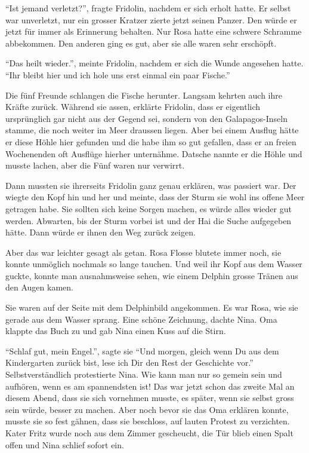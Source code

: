 \enquote{Ist jemand verletzt?}, fragte Fridolin, nachdem er sich erholt hatte. Er selbst war unverletzt, nur ein grosser Kratzer zierte jetzt seinen Panzer. Den würde er jetzt für immer als Erinnerung behalten. Nur Rosa hatte eine schwere Schramme abbekommen. Den anderen ging es gut, aber sie alle waren sehr erschöpft.

\enquote{Das heilt wieder.}, meinte Fridolin, nachdem er sich die Wunde angesehen hatte. \enquote{Ihr bleibt hier und ich hole uns erst einmal ein paar Fische.}

Die fünf Freunde schlangen die Fische herunter. Langsam kehrten auch ihre Kräfte zurück. Während sie assen, erklärte Fridolin, dass er eigentlich ursprünglich gar nicht aus der Gegend sei, sondern von den Galapagos-Inseln stamme, die noch weiter im Meer draussen liegen. Aber bei einem Ausflug hätte er diese Höhle hier gefunden und die habe ihm so gut gefallen, dass er an freien Wochenenden oft Ausflüge hierher unternähme. Datsche nannte er die Höhle und musste lachen, aber die Fünf waren nur verwirrt. 

Dann mussten sie ihrerseits Fridolin ganz genau erklären, was passiert war. Der wiegte den Kopf hin und her und meinte, dass der Sturm sie wohl ins offene Meer getragen habe. Sie sollten sich keine Sorgen machen, es würde alles wieder gut werden. Abwarten, bis der Sturm vorbei ist und der Hai die Suche aufgegeben hätte. Dann würde er ihnen den Weg zurück zeigen.

Aber das war leichter gesagt als getan. Rosa Flosse blutete immer noch, sie konnte unmöglich nochmals so lange tauchen. Und weil ihr Kopf aus dem Wasser guckte, konnte man ausnahmsweise sehen, wie einem Delphin grosse Tränen aus den Augen kamen.

\vspace{10pt}
\centerline{\Huge \Dolphin[DeepPink]}
\vspace{10pt}

Sie waren auf der Seite mit dem Delphinbild angekommen. Es war Rosa, wie sie gerade aus dem Wasser sprang. Eine schöne Zeichnung, dachte Nina. Oma klappte das Buch zu und gab Nina einen Kuss auf die Stirn.

\enquote{Schlaf gut, mein Engel.}, sagte sie \enquote{Und morgen, gleich wenn Du aus dem Kindergarten zurück bist, lese ich Dir den Rest der Geschichte vor.} Selbstverständlich protestierte Nina. Wie kann man nur so gemein sein und aufhören, wenn es am spannendsten ist! Das war jetzt schon das zweite Mal an diesem Abend, dass sie sich vornehmen musste, es später, wenn sie selbst gross sein würde, besser zu machen. Aber noch bevor sie das Oma erklären konnte, musste sie so fest gähnen, dass sie beschloss, auf lauten Protest zu verzichten. Kater Fritz wurde noch aus dem Zimmer gescheucht, die Tür blieb einen Spalt offen und Nina schlief sofort ein.

